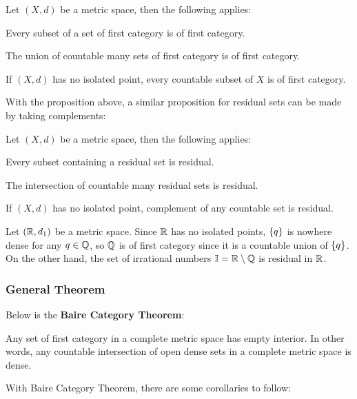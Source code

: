 \documentclass[a4paper,12pt]{article}
\begin{document}
\begin{pst}
  Let $(X,d)$ be a metric space, then the following applies:

  \begin{alist}
    \item Every subset of a set of first category is of first category.
    \item The union of countable many sets of first category is of first category.
    \item If $(X,d)$ has no isolated point, every countable subset of $X$ is of first category.
  \end{alist}
\end{pst}\n

With the proposition above, a similar proposition for residual sets can be made by taking complements:\n

\begin{pst}
  Let $(X,d)$ be a metric space, then the following applies:

  \begin{alist}
    \item Every subset containing a residual set is residual.
    \item The intersection of countable many residual sets is residual.
    \item If $(X,d)$ has no isolated point, complement of any countable set is residual.
  \end{alist}
\end{pst}\n

\begin{exm}
  Let $(\mathbb{R},d_{1})$ be a metric space. Since $\mathbb{R}$ has no isolated points, $\left\{ q\right\}$ is nowhere dense for any $q\in\mathbb{Q}$, so $\mathbb{Q}$ is of first category since it is a countable union of $\left\{ q\right\}$. On the other hand, the set of irrational numbers $\mathbb{I}=\mathbb{R}\setminus\mathbb{Q}$ is residual in $\mathbb{R}$.
\end{exm}

\subsubsection{General Theorem}
Below is the \textbf{Baire Category Theorem}:\n

\begin{thm}
  Any set of first category in a complete metric space has empty interior. In other words, any countable intersection of open dense sets in a complete metric space is dense.
\end{thm}\n

With Baire Category Theorem, there are some corollaries to follow:\n
\end{document}
